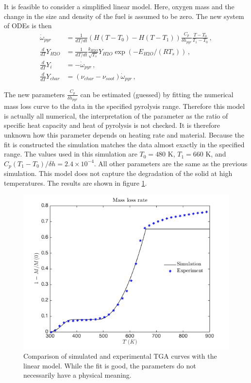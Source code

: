 \documentclass[reqno]{amsart}
\begin{document}
\clearpage
\newpage
It is feasible to consider a simplified linear model. 
Here, oxygen mass and the change in the size and density of the fuel is assumed to be zero. 
The new system of ODEs is then
\begin{align}
\dot{\omega}_{pyr}&=\frac{1}{dT/dt}(H(T-T_0)-H(T-T_1))\frac{C_p}{\delta h_{pyr}}\frac{T-T_0}{T_1-T_0}\,,\\
\frac{d}{dT} Y_{H2O} &=\frac{1}{dT/dt}\frac{k_{H2O}}{\sqrt{T_s}} Y_{H2O} \exp(-E_{H2O}/(RT_s)) \,,\\
\frac{d}{dT}Y_i&=-\dot{\omega}_{pyr}\,,\\
\frac{d}{dT}Y_{char}&=(\nu_{char}-\nu_{soot})\dot{\omega}_{pyr}\,,
\end{align}

The new parameters $\frac{C_p}{\delta h_{pyr}}$ can be estimated (guessed) by fitting the numerical mass loss curve to the data in the specified pyrolysis range. 
Therefore this model is actually all numerical, the interpretation of the parameter as the ratio of specific heat capacity and heat of pyrolysis is not checked. 
It is therefore unknown how this parameter depends on heating rate and material. 
Because the fit is constructed the simulation matches the data almost exactly in the specified range. 
The values used in this simulation are $T_0=480$ K, $T_1=660$ K, and $C_p (T_1-T_0)/\delta h=2.4\times 10^{-4}$. 
All other parameters are the same as the previous simulation.
This model does not capture the degradation of the solid at high temperatures.
The results are shown in figure \ref{fig:simulatedTGAlinear}.
\begin{figure}[h!b]
\centering
  \includegraphics[scale=0.5]{tgaLinear.png}
\caption{Comparison of simulated and experimental TGA curves with the linear model. While the fit is good, the parameters do not necessarily have a physical meaning.}
\label{fig:simulatedTGAlinear}
\end{figure}
\end{document}
